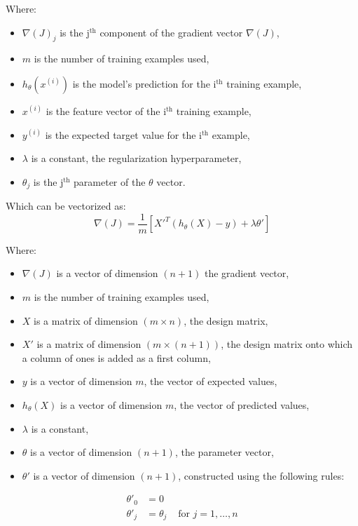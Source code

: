 Where:  
\begin{itemize}
    \item $\nabla(J)_j$ is the j$^\text{th}$ component of the gradient vector $\nabla(J)$,
    \item $m$ is the number of training examples used,
    \item $h_\theta(x^{(i)})$ is the model's prediction for the i$^\text{th}$ training example,
    \item $x^{(i)}$ is the feature vector of the i$^\text{th}$ training example,
    \item $y^{(i)}$ is the expected target value for the i$^\text{th}$ example,
    \item $\lambda$ is a constant, the regularization hyperparameter,
    \item $\theta_j$ is the j$^\text{th}$ parameter of the $\theta$ vector.
\end{itemize}

Which can be vectorized as:
$$
\nabla(J) = \frac{1}{m} [X'^T(h_\theta(X) - y) + \lambda \theta']
$$  

Where:  
\begin{itemize}
    \item $\nabla(J)$ is a vector of dimension $(n + 1)$ the gradient vector,
    \item $m$ is the number of training examples used,
    \item $X$ is a matrix of dimension $(m \times n)$, the design matrix,
    \item $X'$ is a matrix of dimension $(m \times (n + 1))$, the design matrix onto which a column of ones is added as a first column,
    \item $y$ is a vector of dimension $m$, the vector of expected values,
    \item $h_\theta(X)$ is a vector of dimension $m$, the vector of predicted values,
    \item $\lambda$ is a constant,
    \item $\theta$ is a vector of dimension $(n + 1)$, the parameter vector,
    \item $\theta'$ is a vector of dimension $(n + 1)$, constructed using the following rules:
\end{itemize}

$$
\begin{matrix}
\theta'_0 & =  0 \\
\theta'_j & =  \theta_j & \text{ for } j = 1, \dots, n\\    
\end{matrix}
$$

